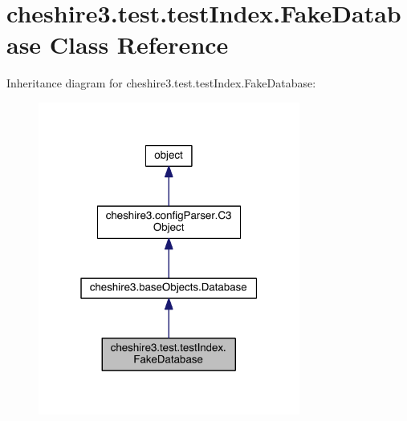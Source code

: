 \hypertarget{classcheshire3_1_1test_1_1test_index_1_1_fake_database}{\section{cheshire3.\-test.\-test\-Index.\-Fake\-Database Class Reference}
\label{classcheshire3_1_1test_1_1test_index_1_1_fake_database}
}


Inheritance diagram for cheshire3.\-test.\-test\-Index.\-Fake\-Database\-:
\nopagebreak
\begin{figure}[H]
\begin{center}
\leavevmode
\includegraphics[width=244pt]{classcheshire3_1_1test_1_1test_index_1_1_fake_database__inherit__graph}
\end{center}
\end{figure}


